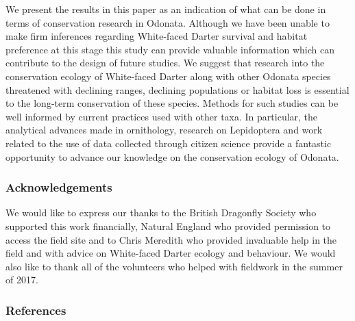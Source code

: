 \documentclass[]{article}
\begin{document}
We present the results in this paper as an indication of what can be
done in terms of conservation research in Odonata. Although we have been
unable to make firm inferences regarding White-faced Darter survival and
habitat preference at this stage this study can provide valuable
information which can contribute to the design of future studies. We
suggest that research into the conservation ecology of White-faced
Darter along with other Odonata species threatened with declining
ranges, declining populations or habitat loss is essential to the
long-term conservation of these species. Methods for such studies can be
well informed by current practices used with other taxa. In particular,
the analytical advances made in ornithology, research on Lepidoptera and
work related to the use of data collected through citizen science
provide a fantastic opportunity to advance our knowledge on the
conservation ecology of Odonata.

\subsubsection{Acknowledgements}\label{acknowledgements}

We would like to express our thanks to the British Dragonfly Society who
supported this work financially, Natural England who provided permission
to access the field site and to Chris Meredith who provided invaluable
help in the field and with advice on White-faced Darter ecology and
behaviour. We would also like to thank all of the volunteers who helped
with fieldwork in the summer of 2017.

\subsubsection{References}\label{references}
\end{document}
